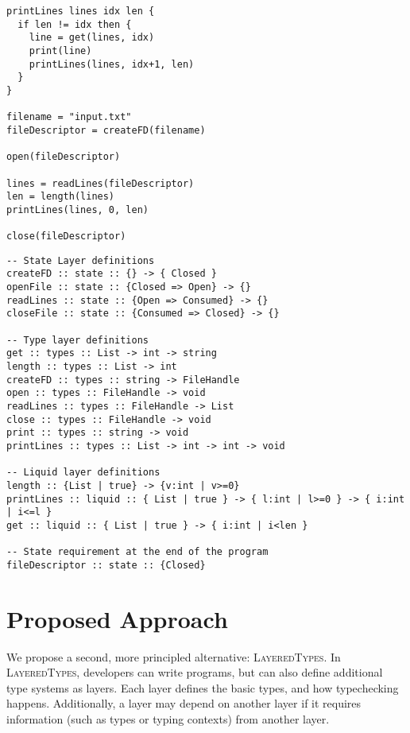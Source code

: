 \documentclass{easychair}
\newcommand{\LayeredTypes}{\textsc{LayeredTypes}}
\begin{document}
\begin{minipage}{0.4\linewidth}
\begin{lstlisting}[caption={Simple example code},label={lst:code_before}]
printLines lines idx len {
  if len != idx then {
    line = get(lines, idx)
    print(line)
    printLines(lines, idx+1, len)
  }
}

filename = "input.txt"
fileDescriptor = createFD(filename)

open(fileDescriptor)

lines = readLines(fileDescriptor)
len = length(lines)
printLines(lines, 0, len)

close(fileDescriptor)
\end{lstlisting}
\end{minipage}%
\begin{minipage}{0.59\linewidth}
\begin{lstlisting}[caption={Annotations for \LayeredTypes},label={lst:code_after}]
-- State Layer definitions
createFD :: state :: {} -> { Closed }
openFile :: state :: {Closed => Open} -> {}
readLines :: state :: {Open => Consumed} -> {}
closeFile :: state :: {Consumed => Closed} -> {}

-- Type layer definitions
get :: types :: List -> int -> string
length :: types :: List -> int
createFD :: types :: string -> FileHandle
open :: types :: FileHandle -> void
readLines :: types :: FileHandle -> List
close :: types :: FileHandle -> void
print :: types :: string -> void
printLines :: types :: List -> int -> int -> void

-- Liquid layer definitions
length :: {List | true} -> {v:int | v>=0}
printLines :: liquid :: { List | true } -> { l:int | l>=0 } -> { i:int | i<=l }
get :: liquid :: { List | true } -> { i:int | i<len }

-- State requirement at the end of the program
fileDescriptor :: state :: {Closed}	
\end{lstlisting}
\end{minipage}



\section{Proposed Approach}
\label{sec:proposed-approach}

We propose a second, more principled alternative: \LayeredTypes. In \LayeredTypes\cite{LayeredTypes}, developers can write programs, but can also define additional type systems as layers. Each layer defines the basic types, and how typechecking happens. Additionally, a layer may depend on another layer if it requires information (such as types or typing contexts) from another layer.
\end{document}
